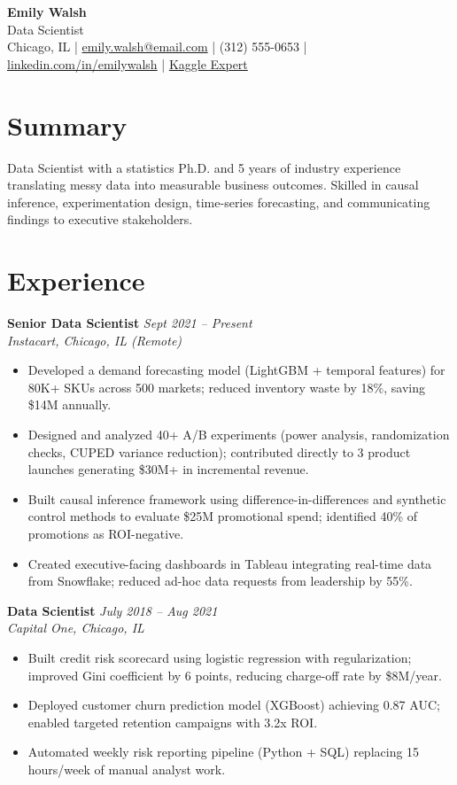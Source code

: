 \documentclass[11pt,a4paper]{article}
\begin{document}
\begin{center}
  {\LARGE \textbf{Emily Walsh}}\\[3pt]
  {\large \textcolor{accent}{Data Scientist}}\\[4pt]
  Chicago, IL \quad|\quad
  \href{mailto:emily.walsh@email.com}{emily.walsh@email.com} \quad|\quad
  (312) 555-0653 \quad|\quad
  \href{https://linkedin.com/in/emilywalsh}{linkedin.com/in/emilywalsh} \quad|\quad
  \href{https://kaggle.com/emilywalsh}{Kaggle Expert}
\end{center}

\section{Summary}
Data Scientist with a statistics Ph.D. and 5 years of industry experience translating messy data into measurable business outcomes. Skilled in causal inference, experimentation design, time-series forecasting, and communicating findings to executive stakeholders.

\section{Experience}

\noindent\textbf{Senior Data Scientist} \hfill \textit{Sept 2021 -- Present}\\
\textit{Instacart, Chicago, IL (Remote)}
\begin{itemize}
  \item Developed a demand forecasting model (LightGBM + temporal features) for 80K+ SKUs across 500 markets; reduced inventory waste by 18\%, saving \$14M annually.
  \item Designed and analyzed 40+ A/B experiments (power analysis, randomization checks, CUPED variance reduction); contributed directly to 3 product launches generating \$30M+ in incremental revenue.
  \item Built causal inference framework using difference-in-differences and synthetic control methods to evaluate \$25M promotional spend; identified 40\% of promotions as ROI-negative.
  \item Created executive-facing dashboards in Tableau integrating real-time data from Snowflake; reduced ad-hoc data requests from leadership by 55\%.
\end{itemize}

\vspace{4pt}
\noindent\textbf{Data Scientist} \hfill \textit{July 2018 -- Aug 2021}\\
\textit{Capital One, Chicago, IL}
\begin{itemize}
  \item Built credit risk scorecard using logistic regression with regularization; improved Gini coefficient by 6 points, reducing charge-off rate by \$8M/year.
  \item Deployed customer churn prediction model (XGBoost) achieving 0.87 AUC; enabled targeted retention campaigns with 3.2x ROI.
  \item Automated weekly risk reporting pipeline (Python + SQL) replacing 15 hours/week of manual analyst work.
\end{itemize}
\end{document}
